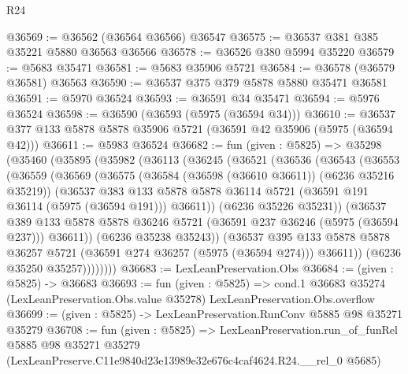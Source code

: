 \begin{lexlean}{R24}
\begin{coremodule}
@36569 := @36562 (@36564 @36566) @36547
@36575 := @36537 @381 @385 @35221 @5880 @36563 @36566
@36578 := @36526 @380 @5994 @35220
@36579 := @5683 @35471
@36581 := @5683 @35906 @5721
@36584 := @36578 (@36579 @36581) @36563
@36590 := @36537 @375 @379 @5878 @5880 @35471 @36581
@36591 := @5970 @36524
@36593 := @36591 @34 @35471
@36594 := @5976 @36524
@36598 := @36590 (@36593 (@5975 (@36594 @34)))
@36610 := @36537 @377 @133 @5878 @5878 @35906 @5721 (@36591 @42 @35906 (@5975 (@36594 @42)))
@36611 := @5983 @36524
@36682 := fun (given : @5825) =>
  @35298
    (@35460
      (@35895
        (@35982
          (@36113
            (@36245
              (@36521
                (@36536
                  (@36543
                    (@36553
                      (@36559
                        (@36569
                          (@36575
                            (@36584 (@36598 (@36610 @36611)) (@6236 @35216 @35219))
                            (@36537
                              @383
                              @133
                              @5878
                              @5878
                              @36114
                              @5721
                              (@36591 @191 @36114 (@5975 (@36594 @191)))
                              @36611))
                          (@6236 @35226 @35231))
                        (@36537
                          @389
                          @133
                          @5878
                          @5878
                          @36246
                          @5721
                          (@36591 @237 @36246 (@5975 (@36594 @237)))
                          @36611))
                      (@6236 @35238 @35243))
                    (@36537
                      @395
                      @133
                      @5878
                      @5878
                      @36257
                      @5721
                      (@36591 @274 @36257 (@5975 (@36594 @274)))
                      @36611))
                  (@6236 @35250 @35257))))))))
@36683 := LexLeanPreservation.Obs
@36684 := (given : @5825) -> @36683
@36693 := fun (given : @5825) =>
  cond.{1} @36683 @35274 (LexLeanPreservation.Obs.value @35278) LexLeanPreservation.Obs.overflow
@36699 := (given : @5825) -> LexLeanPreservation.RunConv @5885 @98 @35271 @35279
@36708 := fun (given : @5825) =>
  LexLeanPreservation.run_of_funRel
    @5885
    @98
    @35271
    @35279
    (LexLeanPreserve.C11e9840d23e13989e32e676c4caf4624.R24.__rel_0 @5685)
\end{coremodule}
\end{lexlean}
